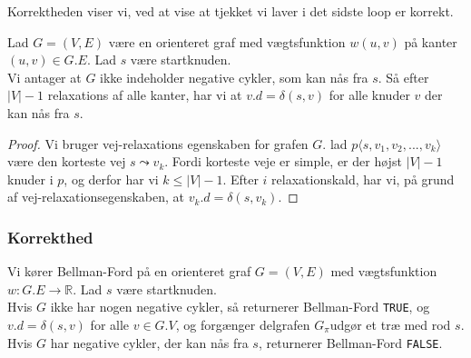 Korrektheden viser vi, ved at vise at tjekket vi laver i det sidste loop er korrekt.
\begin{lemma}
  Lad $G = (V,E)$ være en orienteret graf med vægtsfunktion $w(u,v)$ på kanter $(u,v) \in G.E$. Lad $s$ være startknuden.\\
  Vi antager at $G$ ikke indeholder negative cykler, som kan nås fra $s$. Så efter $|V| - 1$ relaxations af alle kanter, har vi at $v.d = \delta(s,v)$ for alle knuder $v$ der kan nås fra $s$.
\end{lemma}

\begin{proof}
  Vi bruger vej-relaxations egenskaben for grafen $G$. lad $p \langle s, v_1, v_2 , ..., v_k\rangle$ være den korteste vej $s \leadsto v_k$. Fordi korteste veje er simple, er der højst $|V| - 1$ knuder i $p$, og derfor har vi $k \leq |V| - 1$. Efter $i$ relaxationskald, har vi, på grund af vej-relaxationsegenskaben, at $v_k.d = \delta(s,v_k)$.
\end{proof}

\subsubsection{Korrekthed}
\begin{theorem}
  
  Vi kører Bellman-Ford på en orienteret graf $G = (V, E)$ med vægtsfunktion $w : G.E \rightarrow \mathbb{R}$. Lad $s$ være startknuden.\\
  Hvis $G$ ikke har nogen negative cykler, så returnerer Bellman-Ford \texttt{TRUE}, og $v.d = \delta(s,v)$ for alle $v \in G.V$, og forgænger delgrafen $G_\pi$udgør et træ med rod $s$.\\
  Hvis $G$ har negative cykler, der kan nås fra $s$, returnerer Bellman-Ford \texttt{FALSE}.
\end{theorem}

